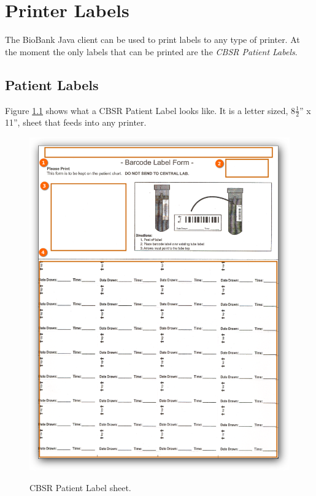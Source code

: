 \chapter{Printer Labels}
\label{chap:printer_labels}

The BioBank Java client can be used to print labels to any type of printer. At
the moment the only labels that can be printed are the \emph{CBSR Patient
  Labels}.

\section{Patient Labels}
\label{sec:printer_labels}

Figure \ref{fig:cbsr_patient_label_sheet} shows what a CBSR Patient Label looks
like. It is a letter sized, 8$\frac{1}{2}$'' x 11'', sheet that feeds into any
printer.

\begin{figure}[H]
  \centering
  \scalebox{0.35}
	   { \includegraphics*{screenshots/printer_labels/01_cbsr_patient_label_sheet} }
	   \caption{CBSR Patient Label sheet.}
	   \label{fig:cbsr_patient_label_sheet}
\end{figure}

